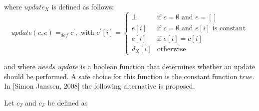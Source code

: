 where $update_{X}$ is defined as follows:%
\begin{equation*}
update(c,e)=_{def}c^{\prime },\text{ with }c^{\prime }[i]=\left\{
\begin{array}{ll}
\bot  & \text{if }c=\emptyset \text{ and }e=[] \\
e[i] & \text{if }c=\emptyset \text{ and }e[i]\text{ is constant} \\
c[i] & \text{if }e[i]=c[i] \\
d_{X}[i] & \text{otherwise}%
\end{array}%
\right.
\end{equation*}

and where $needs\_update$ is a boolean function that determines whether an
update should be performed. A safe choice for this function is the constant
function $true$. In [Simon Janssen, 2008] the following alternative is
proposed.

Let $c_{T}$ and $c_{F}$ be defined as

